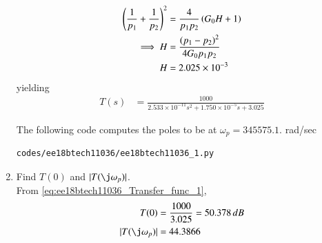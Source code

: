 \begin{enumerate}[label=\arabic*.,ref=\theenumi]

\begin{align}
    \left(\frac{1}{p_1}+\frac{1}{p_2}\right)^2&= \frac{4}{p_1p_2}\left(G_0H+1\right)
    \label{eq:ee18btech11036_h}
\\
\implies     H &= \frac{\left(p_1-p_2\right)^2}{4G_0p_1p_2}
    \label{eq:ee18btech11036_h_final}
\\
    H &= 2.025 \times 10^{-3}
    \label{eq:ee18btech11036_h_value}
\end{align}
yielding
\begin{align}
    T(s) &= \frac{1000}{2.533 \times 10^{-11}s^2+1.750 \times 10^{-5}s+3.025}
    \label{eq:ee18btech11036_Transfer_func_1}
\end{align}

The following code computes the poles to be at $\omega_p = 345575.1$. rad/sec
\begin{lstlisting}
codes/ee18btech11036/ee18btech11036_1.py
\end{lstlisting}



\item Find $T(0)$ and $\abs{T(\j\omega_p)}$.
\\
\solution From \ref{eq:ee18btech11036_Transfer_func_1}, 
\begin{align}
    T(0)&= \frac{1000}{3.025} =  50.378 \, dB
    \label{eq:ee18btech11036_zero_gain_value}
\\
\abs{T(\j\omega_p)} &=44.3866
\end{align}
%


\end{enumerate}
